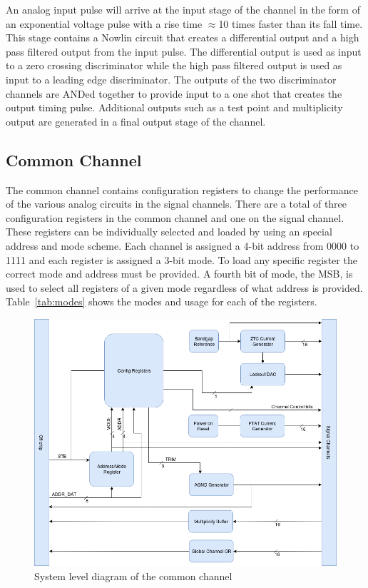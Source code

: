 \documentclass[12pt,oneside,final]{siuethesis}
\theoremstyle{definition}
\begin{document}
\par An analog input pulse will arrive at the input stage of the channel in the form of an exponential voltage pulse with a rise time $\approx$10 times faster than its fall time. This stage contains a Nowlin circuit that creates a differential output and a high pass filtered output from the input pulse. The differential output is used as input to a zero crossing discriminator while the high pass filtered output is used as input to a leading edge discriminator. The outputs of the two discriminator channels are ANDed together to provide input to a one shot that creates the output timing pulse. Additional outputs such as a test point and multiplicity output are generated in a final output stage of the channel. 

\subsection{Common Channel}
\par The common channel contains configuration registers to change the performance of the various analog circuits in the signal channels. There are a total of three configuration registers in the common channel and one on the signal channel. These registers can be individually selected and loaded by using an special address and mode scheme. Each channel is assigned a 4-bit address from 0000 to 1111 and each register is assigned a 3-bit mode. To load any specific register the correct mode and address must be provided. A fourth bit of mode, the MSB, is used to select all registers of a given mode regardless of what address is provided. Table~\ref{tab:modes} shows the modes and usage for each of the registers.

\begin{figure}[htbp!]
\centering
\includegraphics[scale=.5,keepaspectratio=true]{./ch2_figures/common_block.png} 
\caption{System level diagram of the common channel}
\label{fig:common-block}
\end{figure}
\end{document}
